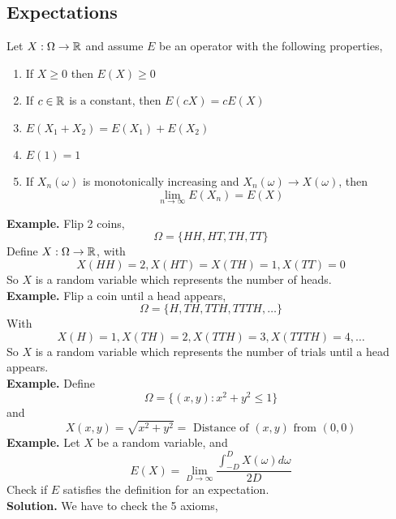 \documentclass[openany]{report}
\begin{document}
\subsection{Expectations}
\begin{definition}
    
    Let $X: \Omega \to \mathbb{R}$ and assume $E$ be an operator with the following properties, 
    \begin{enumerate}
        \item If $X \geq 0$ then $E(X) \geq 0$
        \item If $c \in \mathbb{R}$ is a constant, then $E(cX) = cE(X)$
        \item $E(X_1 + X_2) = E(X_1) + E(X_2)$
        \item $E(1) = 1$
        \item If $X_n(\omega)$ is monotonically increasing and $X_n(\omega) \rightarrow X(\omega)$, then 
        \[\lim_{n\rightarrow \infty} E(X_n) = E(X)\]
    \end{enumerate}
\end{definition}
\noindent
\textbf{Example.} Flip 2 coins, 
\[\Omega = \{HH, HT, TH, TT\}\]
Define $X: \Omega \rightarrow \mathbb{R}$, with 
\[X(HH) = 2, X(HT) = X(TH) = 1, X(TT) = 0\]
So $X$ is a random variable which represents the number of heads.\\[2ex]
\textbf{Example.} Flip a coin until a head appears, 
\[\Omega = \{H, TH, TTH, TTTH, \ldots\}\]
With 
\[X(H) = 1, X(TH) = 2, X(TTH) = 3, X(TTTH) = 4, \ldots\]
So $X$ is a random variable which represents the number of trials until a head appears.\\[2ex]
\textbf{Example.} Define 
\[\Omega = \{(x,y): x^2 + y^2 \leq 1\}\]
and 
\[X(x,y) = \sqrt{x^2 + y^2} = \text{ Distance of $(x,y)$ from $(0,0)$}\]
\textbf{Example.} Let $X$ be a random variable, and
\[E(X) = \lim_{D \rightarrow \infty} \frac{\int_{-D}^D X(\omega)d\omega}{2D}\]
Check if $E$ satisfies the definition for an expectation. \\[2ex]
\textbf{Solution.} We have to check the 5 axioms, 
\end{document}
